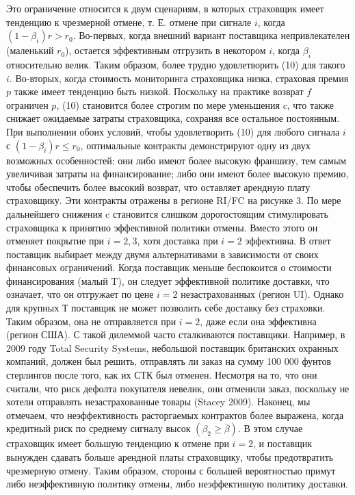 \documentclass[a4paper,12pt]{article}
\begin{document}
Это ограничение относится к двум сценариям, в которых страховщик имеет тенденцию к чрезмерной отмене, т. Е. отмене при сигнале $i$, когда $(1-\beta_{i})r > r_{0}$. Во-первых, когда внешний вариант поставщика непривлекателен (маленький $r_{0}$), остается эффективным отгрузить в некотором $i$, когда $\beta_{i}$ относительно велик. Таким образом, более трудно удовлетворить (10) для такого $i$. Во-вторых, когда стоимость мониторинга страховщика низка, страховая премия $p$ также имеет тенденцию быть низкой. Поскольку на практике возврат $f$ ограничен $p$, (10) становится более строгим по мере уменьшения $c$, что также снижает ожидаемые затраты страховщика, сохраняя все остальное постоянным. При выполнении обоих условий, чтобы удовлетворить (10) для любого сигнала $i$ с $(1-\beta_{i})r \leq r_{0}$, оптимальные контракты демонстрируют одну из двух возможных особенностей: они либо имеют более высокую франшизу, тем самым увеличивая затраты на финансирование; либо они имеют более высокую премию, чтобы обеспечить более высокий возврат, что оставляет арендную плату страховщику. Эти контракты отражены в регионе RI/FC на рисунке 3. По мере дальнейшего снижения c становится слишком дорогостоящим стимулировать страховщика к принятию эффективной политики отмены. Вместо этого он отменяет покрытие при $i = 2, 3$, хотя доставка при $i = 2$ эффективна. В ответ поставщик выбирает между двумя альтернативами в зависимости от своих финансовых ограничений. Когда поставщик меньше беспокоится о стоимости финансирования (малый T), он следует эффективной политике доставки, что означает, что он отгружает по цене $i=2$ незастрахованных (регион UI). Однако для крупных Т поставщик не может позволить себе доставку без страховки. Таким образом, она не отправляется при $i = 2$, даже если она эффективна (регион США). С такой дилеммой часто сталкиваются поставщики. Например, в 2009 году Total Security Systems, небольшой поставщик британских охранных компаний, должен был решить, отправлять ли заказ на сумму 100 000 фунтов стерлингов после того, как их СТК был отменен. Несмотря на то, что они считали, что риск дефолта покупателя невелик, они отменили заказ, поскольку не хотели отправлять незастрахованные товары (Stacey 2009).
Наконец, мы отмечаем, что неэффективность расторгаемых контрактов более выражена, когда кредитный риск по среднему сигналу высок $(\beta_{2} \geq \overline{\beta})$. В этом случае страховщик имеет большую тенденцию к отмене при $i = 2$, и поставщик вынужден сдавать больше арендной платы страховщику, чтобы предотвратить чрезмерную отмену. Таким образом, стороны с большей вероятностью примут либо неэффективную политику отмены, либо неэффективную политику доставки.
\end{document}
